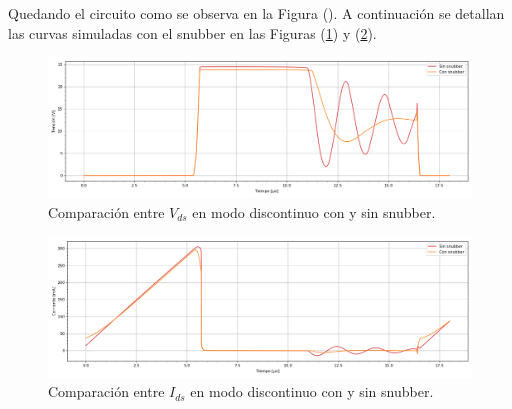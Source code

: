 Quedando el circuito como se observa en la Figura (). A continuación se detallan las curvas simuladas con el snubber en las Figuras (\ref{ej4:fig:vds_snub}) y (\ref{ej4:fig:il_snub}).


\begin{figure}[H]
	\centering
	\includegraphics[width=\linewidth]{ImagenesEjercicio-4/comparacion-vds}
	\caption{Comparación entre $V_{ds}$ en modo discontinuo con y sin snubber.}
	\label{ej4:fig:vds_snub}
\end{figure}

\begin{figure}[H]
	\centering
	\includegraphics[width=\linewidth]{ImagenesEjercicio-4/comparacion-ids}
	\caption{Comparación entre $I_{ds}$ en modo discontinuo con y sin snubber.}
	\label{ej4:fig:il_snub}
\end{figure}

